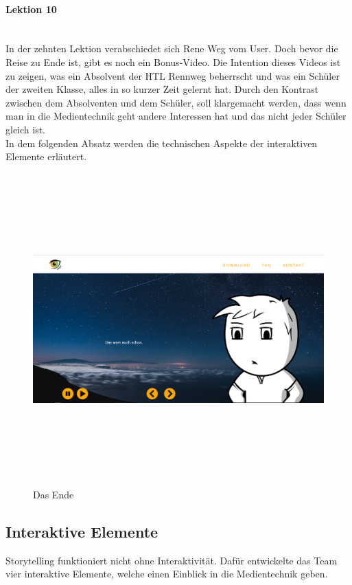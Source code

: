 \paragraph{Lektion 10} \leavevmode \\
In der zehnten Lektion verabschiedet sich Rene Weg vom User. Doch bevor die Reise zu Ende ist, gibt es noch ein Bonus-Video. Die Intention dieses Videos ist zu zeigen, was ein Absolvent der HTL Rennweg beherrscht und was ein Schüler der zweiten Klasse, alles in so kurzer Zeit gelernt hat. Durch den Kontrast zwischen dem Absolventen und dem Schüler, soll klargemacht werden, dass wenn man in die Medientechnik geht andere Interessen hat und das nicht jeder Schüler gleich ist. \leavevmode \\
In dem folgenden Absatz werden die technischen Aspekte der interaktiven Elemente erläutert.
\begin{figure}[h]
	\centering
\includegraphics[width=12cm,height=12cm,keepaspectratio]{webseite_abb21} 
	\caption{Das Ende}
\end{figure}
\subsection{Interaktive Elemente}
Storytelling funktioniert nicht ohne Interaktivität.  Dafür entwickelte das Team vier interaktive Elemente, welche einen Einblick in die Medientechnik geben. 

